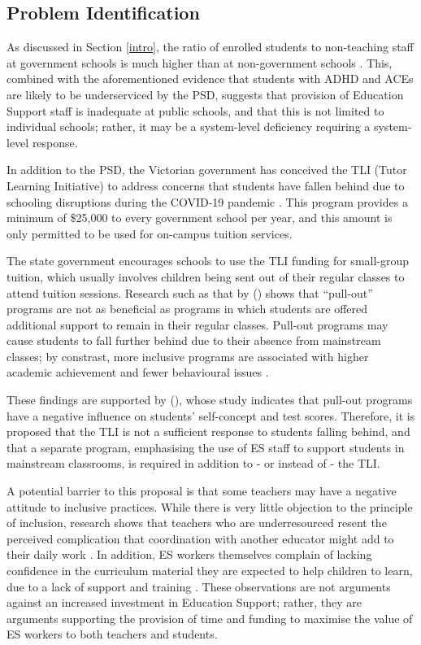 \documentclass[11pt, a4paper]{article}
\begin{document}
    \subsection{Problem Identification} \label{problem_id}

    As discussed in Section \ref{intro}, the ratio of enrolled students to non-teaching staff at government schools is much higher than at non-government schools \parencite{acara_profiles}. This, combined with the aforementioned evidence that students with ADHD and ACEs are likely to be underserviced by the PSD, suggests that provision of Education Support staff is inadequate at public schools, and that this is not limited to individual schools; rather, it may be a system-level deficiency requiring a system-level response.

    In addition to the PSD, the Victorian government has conceived the TLI (Tutor Learning Initiative) to address concerns that students have fallen behind due to schooling disruptions during the COVID-19 pandemic \parencite{tli}. This program provides a minimum of \$25,000 to every government school per year, and this amount is only permitted to be used for on-campus tuition services. 

    The state government encourages schools to use the TLI funding for small-group tuition, which usually involves children being sent out of their regular classes to attend tuition sessions. Research such as that by  () shows that ``pull-out'' programs are not as beneficial as programs in which students are offered additional support to remain in their regular classes. Pull-out programs may cause students to fall further behind due to their absence from mainstream classes; by constrast, more inclusive programs are associated with higher academic achievement and fewer behavioural issues \parencite{pullout_rea}.
    
    These findings are supported by  (), whose study indicates that pull-out programs have a negative influence on students' self-concept and test scores. Therefore, it is proposed that the TLI is not a sufficient response to students falling behind, and that a separate program, emphasising the use of ES staff to support students in mainstream classrooms, is required in addition to - or instead of - the TLI. 

    A potential barrier to this proposal is that some teachers may have a negative attitude to inclusive practices. While there is very little objection to the principle of inclusion, research shows that teachers who are underresourced resent the perceived complication that coordination with another educator might add to their daily work \parencite{teacher_attitudes}. In addition, ES workers themselves complain of lacking confidence in the curriculum material they are expected to help children to learn, due to a lack of support and training \parencite{unimelb_aides}. These observations are not arguments against an increased investment in Education Support; rather, they are arguments supporting the provision of time and funding to maximise the value of ES workers to both teachers and students.
\end{document}
